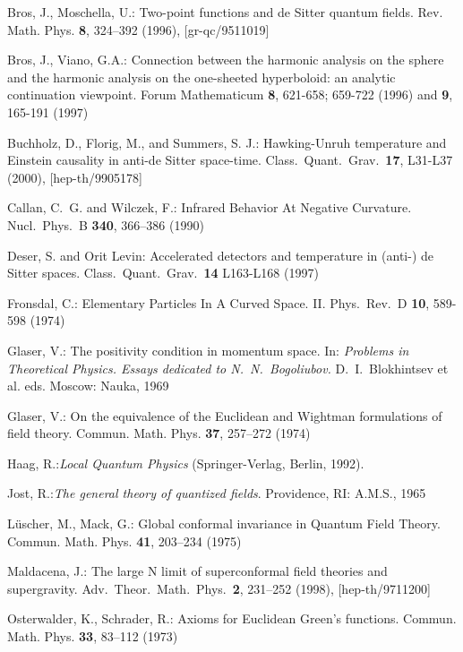 \documentclass[a4paper,a4paper]{article}
\begin{document}
\begin{thebibliography}{99}
  Bros, J., Moschella, U.: {Two-point functions and de Sitter
quantum fields}. Rev. Math. Phys. {\bf 8}, 324--392 (1996),
[gr-qc/9511019]

  Bros, J., Viano, G.A.:  {Connection between the harmonic
analysis on the sphere and the harmonic analysis on the
one-sheeted hyperboloid: an analytic continuation viewpoint}.
Forum Mathematicum {\bf 8}, 621-658; 659-722 (1996) and {\bf 9},
165-191 (1997)

Buchholz, D., Florig, M., and Summers, S. J.: Hawking-Unruh
temperature and Einstein causality in anti-de Sitter space-time.
Class.\ Quant.\ Grav.\ {\bf 17}, L31-L37 (2000), [hep-th/9905178]



Callan, C.~G. and Wilczek, F.: Infrared Behavior At Negative
Curvature. Nucl.\ Phys.\ B {\bf 340}, 366--386 (1990)


Deser, S. and Orit Levin: Accelerated detectors and temperature in
(anti-) de Sitter spaces. Class.\ Quant.\ Grav.\ {\bf 14}
L163-L168 (1997)

Fronsdal, C.: Elementary Particles In A Curved Space. II. Phys.\
Rev.\ D {\bf 10},  589-598 (1974)

 Glaser, V.:
The positivity condition in momentum space. In: {\it Problems in
Theoretical Physics. Essays dedicated to N.~N.~Bogoliubov.}
D.~I.~Blokhintsev et al. eds. Moscow: Nauka, 1969

 Glaser, V.:
On the equivalence of the Euclidean and Wightman formulations of
field theory. Commun. Math. Phys. {\bf 37}, 257--272 (1974)

 Haag, R.:{\it Local Quantum Physics}
(Springer-Verlag, Berlin, 1992).

  Jost, R.:{\it The general theory of quantized fields}.
Providence, RI: A.M.S., 1965

 L\"uscher, M., Mack, G.:
Global conformal invariance in Quantum Field Theory.
Commun. Math. Phys. {\bf 41}, 203--234  (1975)

Maldacena, J.: The large N limit of superconformal field theories
and supergravity. Adv.\ Theor.\ Math.\ Phys.\  {\bf 2}, 231--252
(1998), [hep-th/9711200]


 Osterwalder, K., Schrader, R.:
Axioms for Euclidean Green's functions. Commun. Math. Phys. {\bf
33}, 83--112 (1973)


\end{thebibliography}
\end{document}
